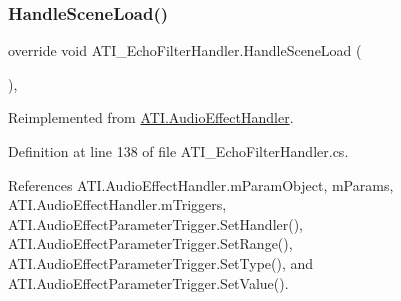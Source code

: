\subsubsection{\texorpdfstring{Handle\+Scene\+Load()}{HandleSceneLoad()}}
{\footnotesize\ttfamily override void A\+T\+I\+\_\+\+Echo\+Filter\+Handler.\+Handle\+Scene\+Load (\begin{DoxyParamCaption}{ }\end{DoxyParamCaption})\hspace{0.3cm}{\ttfamily [protected]}, {\ttfamily [virtual]}}



Reimplemented from \hyperlink{class_a_t_i_1_1_audio_effect_handler_aa038c62089df16a01d2749986649db11}{A\+T\+I.\+Audio\+Effect\+Handler}.



Definition at line 138 of file A\+T\+I\+\_\+\+Echo\+Filter\+Handler.\+cs.



References A\+T\+I.\+Audio\+Effect\+Handler.\+m\+Param\+Object, m\+Params, A\+T\+I.\+Audio\+Effect\+Handler.\+m\+Triggers, A\+T\+I.\+Audio\+Effect\+Parameter\+Trigger.\+Set\+Handler(), A\+T\+I.\+Audio\+Effect\+Parameter\+Trigger.\+Set\+Range(), A\+T\+I.\+Audio\+Effect\+Parameter\+Trigger.\+Set\+Type(), and A\+T\+I.\+Audio\+Effect\+Parameter\+Trigger.\+Set\+Value().


